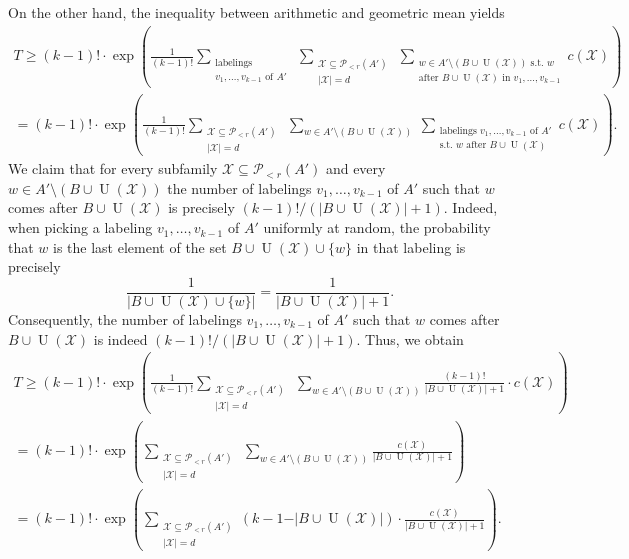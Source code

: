 On the other hand, the inequality between arithmetic and geometric mean yields
\begin{multline*}
T\geq (k-1)!\cdot \exp\left(\frac{1}{(k-1)!}\sum_{\substack{\text{labelings }\\v_1,\dots, v_{k-1}\text{ of } A'}}\ \sum_{\substack{\mathcal{X}\subseteq \mathcal{P}\!_{<r}(A')\\\vert \mathcal{X}\vert=d}}\ \sum_{\substack{w\in A'\setminus(B\cup \operatorname{U}(\mathcal{X}))\text{ s.t. }w\\\text{after }B\cup \operatorname{U}(\mathcal{X})\text{ in }v_1,\dots,v_{k-1}}}c(\mathcal{X})\right)\\
=(k-1)!\cdot \exp\left(\frac{1}{(k-1)!}\sum_{\substack{\mathcal{X}\subseteq \mathcal{P}\!_{<r}(A')\\\vert \mathcal{X}\vert=d}}\ \sum_{w\in A'\setminus(B\cup \operatorname{U}(\mathcal{X}))}\ \sum_{\substack{\text{labelings }v_1,\dots, v_{k-1}\text{ of } A'\\\text{s.t. }w\text{ after }B\cup \operatorname{U}(\mathcal{X})}}c(\mathcal{X})\right).
\end{multline*}
We claim that for every subfamily $\mathcal{X}\subseteq \mathcal{P}\!_{<r}(A')$ and every $w\in A'\setminus(B\cup  \operatorname{U}(\mathcal{X}))$ the number of labelings $v_1,\dots,v_{k-1}$ of $A'$ such that $w$ comes after $B\cup  \operatorname{U}(\mathcal{X})$ is precisely $(k-1)!/(\vert B\cup  \operatorname{U}(\mathcal{X})\vert+1)$. Indeed, when picking a labeling $v_1,\dots,v_{k-1}$ of $A'$ uniformly at random, the probability that $w$ is the last element of the set $B\cup  \operatorname{U}(\mathcal{X})\cup \lbrace w\rbrace$ in that labeling is precisely
\[\frac{1}{\vert B\cup  \operatorname{U}(\mathcal{X})\cup \lbrace w\rbrace\vert}=\frac{1}{\vert B\cup  \operatorname{U}(\mathcal{X})\vert+1}.\]
Consequently, the number of labelings $v_1,\dots,v_{k-1}$ of $A'$ such that $w$ comes after $B\cup  \operatorname{U}(\mathcal{X})$ is indeed $(k-1)!/(\vert B\cup  \operatorname{U}(\mathcal{X})\vert+1)$. Thus, we obtain
\begin{multline*}
T \geq (k-1)!\cdot \exp\left(\frac{1}{(k-1)!}\sum_{\substack{\mathcal{X}\subseteq \mathcal{P}\!_{<r}(A')\\\vert \mathcal{X}\vert=d}}\ \sum_{w\in A'\setminus(B\cup \operatorname{U}(\mathcal{X}))}\frac{(k-1)!}{\vert B\cup  \operatorname{U}(\mathcal{X})\vert+1}\cdot c(\mathcal{X})\right)\\
=(k-1)!\cdot \exp\left(\sum_{\substack{\mathcal{X}\subseteq \mathcal{P}\!_{<r}(A')\\\vert \mathcal{X}\vert=d}}\ \sum_{w\in A'\setminus(B\cup \operatorname{U}(\mathcal{X}))}\frac{c(\mathcal{X})}{\vert B\cup \operatorname{U}(\mathcal{X})\vert+1}\right)\\
=(k-1)!\cdot \exp\left(\sum_{\substack{\mathcal{X}\subseteq \mathcal{P}\!_{<r}(A')\\\vert \mathcal{X}\vert=d}}(k-1-\vert B\cup \operatorname{U}(\mathcal{X})\vert)\cdot \frac{c(\mathcal{X})}{\vert B\cup \operatorname{U}(\mathcal{X})\vert+1}\right).
\end{multline*}
